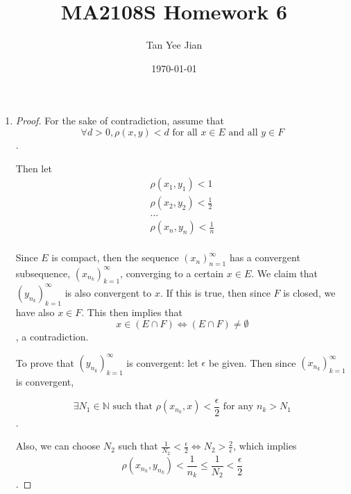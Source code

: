 \documentclass[12pt, a4paper]{article}
\title{MA2108S Homework 6}
\author{Tan Yee Jian}
\date{\today}
\newcommand{\seqn}[1]{(#1)^\infty_{n=1}}
\newcommand{\seqk}[1]{(#1)^\infty_{k=1}}
\begin{document}
\maketitle
\begin{enumerate}
  \item \begin{proof} %
      For the sake of contradiction, assume that
      \[\forall d>0, \rho(x,y)<d\text{ for all }x\in E\text{ and all }y\in
        F\].

      Then let
      \begin{gather*}
        \rho(x_1,y_1) < 1\\
        \rho(x_2,y_2) < \frac{1}{2}\\
        \dots\\
        \rho(x_n,y_n) < \frac{1}{n}\\
      \end{gather*}

      Since $E$ is compact, then the sequence $\seqn{x_n}$  has a convergent
      subsequence, $\seqk{x_{n_k}}$, converging to a certain $x\in E$. We
      claim that $\seqk{y_{n_k}}$ is also convergent to $x$. If this is true,
      then since $F$ is closed, we have also $x\in F$. This then implies that
      \[ x\in (E\cap F) \iff (E\cap F)\neq\emptyset \], a contradiction.

      To prove that $\seqk{y_{n_k}}$ is convergent: let $\epsilon$ be given.
      Then since $\seqk{x_{n_k}}$ is convergent,

      \[ \exists N_1\in\mathbb{N} \text{ such that }\rho(x_{n_k}, x)
        <\frac{\epsilon}{2}\text{ for any } n_k>N_1\].

      Also, we can choose $N_2$ such that $ \frac{1}{N_2} <\frac{\epsilon}{2}
      \iff N_2 > \frac{2}{\epsilon}$, which implies
      \[ \rho(x_{n_k},y_{n_k}) < \frac{1}{n_k} \leq \frac{1}{N_2} <
        \frac{\epsilon}{2} \].


\end{proof}
\end{enumerate}
\end{document}
